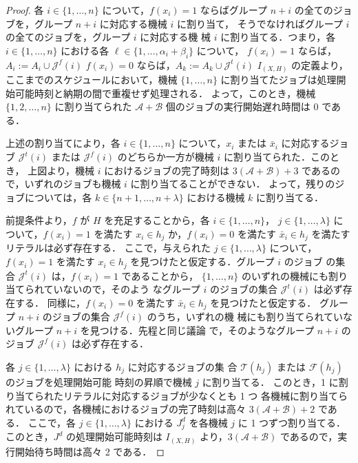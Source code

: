 \documentclass[12pt]{optlab-bachelor}
\begin{document}
  \begin{proof}
    各 $i \in \{1,\ldots, n\}$ について，$f(x_i) = 1$ ならばグループ $n +
    i$ の全てのジョブを，グループ $n + i$ に対応する機械 $i$ に割り当て，
    そうでなければグループ $i$ の全てのジョブを，グループ $i$ に対応する機
    械 $i$ に割り当てる．つまり，各 $i \in \{1,\ldots, n\}$ における各
    $\ell \in \{1,\ldots,\alpha_i + \beta_i\}$ について，
    $f(x_i) = 1$ ならば，$A_i := A_i \cup \mathcal{J}^f(i)$
    $f(x_i) = 0$ ならば，$A_k := A_k \cup \mathcal{J}^t(i)$
    $I_{(X,H)}$ の定義より，ここまでのスケジュールにおいて，機械
    $\{1,\ldots, n\}$ に割り当てたジョブは処理開始可能時刻と納期の間で重複せず処理される．
    よって，このとき，機械 $\{1,2,\ldots,n\}$ に割り当てられた
    $\mathcal{A} + \mathcal{B}$ 個のジョブの実行開始遅れ時間は $0$ である．

    上述の割り当てにより，各 $i \in \{1,\ldots,n\}$ について，$x_i$ または
    $\bar x_i$ に対応するジョブ $\mathcal{J}^t(i)$ または
    $\mathcal{J}^f(i)$ のどちらか一方が機械 $i$ に割り当てられた．このとき，
    上図より，機械 $i$ におけるジョブの完了時刻は $3(\mathcal{A} +
    \mathcal{B}) + 3$ であるので，いずれのジョブも機械 $i$ に割り当てることができない．
    よって，残りのジョブについては，各 $k \in \{n + 1,\ldots,n +
    \lambda\}$ における機械 $k$ に割り当てる．

    前提条件より，$f$ が $H$ を充足することから，各 $i \in \{1,\ldots,n\}$，
    $j \in \{1, \ldots, \lambda \}$ について，$f(x_i) = 1$ を満たす $x_i
    \in h_j$ か，$f(x_i) = 0$ を満たす $\bar x_i \in h_j$ を満たすリテラルは必ず存在する．
    ここで，与えられた $j \in \{1, \ldots, \lambda \}$ について，$f(x_i) =
    1$ を満たす $x_i \in h_j$ を見つけたと仮定する．グループ $i$ のジョブ
    の集合 $\mathcal{J}^t(i)$ は，$f(x_i) = 1$ であることから，
    $\{1,\ldots,n\}$ のいずれの機械にも割り当てられていないので，そのよう
    なグループ $i$ のジョブの集合 $\mathcal{J}^t(i)$ は必ず存在する．
    同様に，$f(x_i) = 0$ を満たす $\bar x_i \in h_j$ を見つけたと仮定する．
    グループ $n + i$ のジョブの集合 $\mathcal{J}^f(i)$ のうち，いずれの機
    械にも割り当てられていないグループ $n + i$ を見つける．先程と同じ議論
    で，そのようなグループ $n + i$ のジョブ $\mathcal{J}^f(i)$ は必ず存在する．

    各 $j \in \{1, \ldots, \lambda \}$ における $h_j$ に対応するジョブの集
    合 $\mathcal{T}(h_j)$ または $\mathcal{F}(h_j)$ のジョブを処理開始可能
    時刻の昇順で機械 $j$ に割り当てる．
    このとき，1 に割り当てられたリテラルに対応するジョブが少なくとも 1 つ
    各機械に割り当てられているので，各機械におけるジョブの完了時刻は高々
    $3(\mathcal{A} + \mathcal{B}) + 2$ である．
    ここで，各 $j \in \{1,\ldots,\lambda\}$ における $J^d_j$ を各機械 $j$
    に 1 つずつ割り当てる．
    このとき，$J^d$ の処理開始可能時刻は $I_{(X,H)}$ より，$3(\mathcal{A}
    + \mathcal{B})$ であるので，実行開始待ち時間は高々 2 である．


\end{proof}
\end{document}
